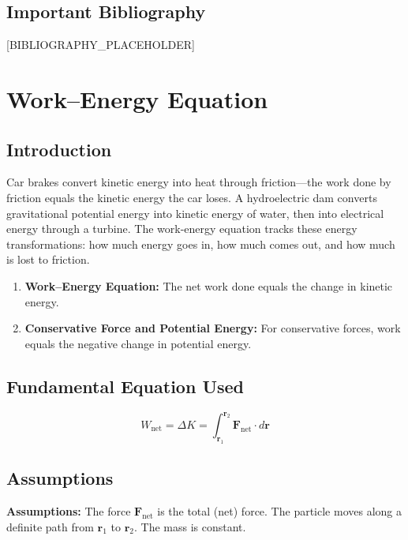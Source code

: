 \documentclass[11pt,openright]{book}
\begin{document}
\section*{Important Bibliography}

[BIBLIOGRAPHY_PLACEHOLDER]


\chapter{Work--Energy Equation}

\section*{Introduction}

Car brakes convert kinetic energy into heat through friction---the work done by friction equals the kinetic energy the car loses. A hydroelectric dam converts gravitational potential energy into kinetic energy of water, then into electrical energy through a turbine. The work-energy equation tracks these energy transformations: how much energy goes in, how much comes out, and how much is lost to friction.

\begin{enumerate}
\item \textbf{Work--Energy Equation:} The net work done equals the change in kinetic energy.

\item \textbf{Conservative Force and Potential Energy:} For conservative forces, work equals the negative change in potential energy.

\end{enumerate}
\section*{Fundamental Equation Used}

\[
W_{\text{net}} = \Delta K = \int_{\mathbf{r}_1}^{\mathbf{r}_2} \mathbf{F}_{\text{net}} \cdot d\mathbf{r}
\]


\item
\section*{Assumptions}

\textbf{Assumptions:} The force $\mathbf{F}_{\text{net}}$ is the total (net) force. The particle moves along a definite path from $\mathbf{r}_1$ to $\mathbf{r}_2$. The mass is constant.
\end{document}
